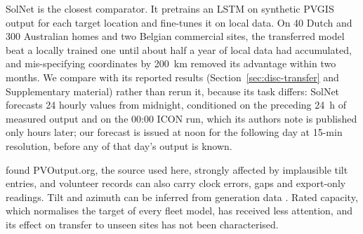 SolNet \citep{Depoortere2025} is the closest comparator. It pretrains an LSTM on synthetic PVGIS output for each target location and fine-tunes it on local data. On 40 Dutch and 300 Australian homes and two Belgian commercial sites, the transferred model beat a locally trained one until about half a year of local data had accumulated, and mis-specifying coordinates by 200~km removed its advantage within two months. We compare with its reported results (Section~\ref{sec:disc-transfer} and Supplementary material) rather than rerun it, because its task differs: SolNet forecasts 24 hourly values from midnight, conditioned on the preceding 24~h of measured output and on the 00:00 ICON run, which its authors note is published only hours later; our forecast is issued at noon for the following day at 15-min resolution, before any of that day's output is known.

\citet{Killinger2018} found PVOutput.org, the source used here, strongly affected by implausible tilt entries, and volunteer records can also carry clock errors, gaps and export-only readings. Tilt and azimuth can be inferred from generation data \citep{Meng2020}. Rated capacity, which normalises the target of every fleet model, has received less attention, and its effect on transfer to unseen sites has not been characterised.
